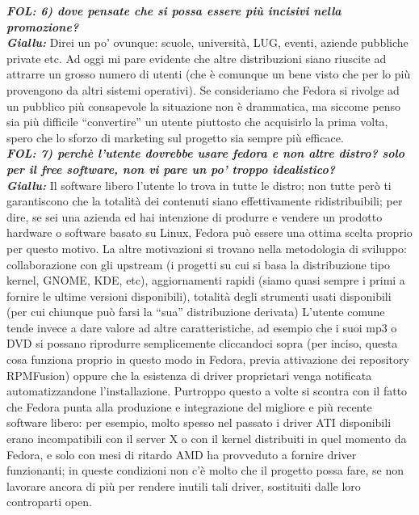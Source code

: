 \emph{\textbf{FOL: 6) dove pensate che si possa essere più incisivi nella promozione?}}\\
\emph{\textbf{Giallu: }}Direi un po' ovunque: scuole, università, LUG, eventi, aziende pubbliche private etc. 
Ad oggi mi pare evidente che altre distribuzioni siano riuscite ad attrarre un grosso numero di utenti (che è comunque un bene visto che per lo più provengono da altri sistemi operativi). Se consideriamo che Fedora si rivolge ad un pubblico più consapevole la situazione non è drammatica, ma siccome penso sia più difficile ``convertire'' un utente piuttosto che acquisirlo la prima volta, spero che lo sforzo di marketing sul progetto sia sempre più efficace.\\

\emph{\textbf{FOL: 7) perchè l'utente dovrebbe usare fedora e non altre distro? solo per il free software, non vi pare un po' troppo idealistico?}}\\
\emph{\textbf{Giallu: }}Il software libero l'utente lo trova in tutte le distro; non tutte però ti garantiscono che la totalità dei contenuti siano effettivamente ridistribuibili; per dire, se sei una azienda ed hai intenzione di produrre e vendere un prodotto hardware o software basato su Linux, Fedora può essere una ottima scelta proprio per questo motivo. La altre motivazioni si trovano nella metodologia di sviluppo: collaborazione con gli upstream (i progetti su cui si basa la distribuzione tipo kernel, GNOME, KDE, etc), aggiornamenti rapidi (siamo quasi sempre i primi a fornire le ultime versioni disponibili), totalità degli strumenti usati disponibili (per cui chiunque può farsi la ``sua'' distribuzione derivata)
L'utente comune tende invece a dare valore ad altre caratteristiche, ad esempio che i suoi mp3 o DVD si possano riprodurre semplicemente cliccandoci sopra (per inciso, questa cosa funziona proprio in questo modo in Fedora, previa attivazione dei repository RPMFusion) oppure che la esistenza di driver proprietari venga notificata automatizzandone l'installazione.
Purtroppo questo a volte si scontra con il fatto che Fedora punta alla produzione e integrazione del migliore e più recente software libero: per esempio, molto spesso nel passato i driver ATI disponibili erano incompatibili con il server X o con il kernel distribuiti in quel momento da Fedora, e solo con mesi di ritardo AMD ha provveduto a fornire driver funzionanti; in queste condizioni non c'è molto che il progetto possa fare, se non lavorare ancora di più per rendere inutili tali driver, sostituiti dalle loro controparti open.\\


